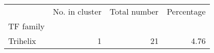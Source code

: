 \begin{tabular}{lrrr}
\toprule
{} &  No. in cluster &  Total number &  Percentage \\
TF family &                 &               &             \\
\midrule
Trihelix  &               1 &            21 &        4.76 \\
\bottomrule
\end{tabular}
